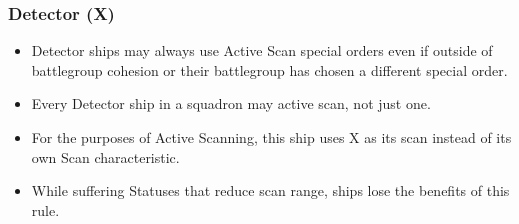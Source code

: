 \subsubsection{Detector (X)}
\begin{itemize}
    \item Detector ships may always use Active Scan special orders even if outside of battlegroup cohesion or their battlegroup has chosen a different special order.
    \item Every Detector ship in a squadron may active scan, not just one.
    \item For the purposes of Active Scanning, this ship uses X as its scan instead of its own Scan characteristic.
    \item While suffering Statuses that reduce scan range, ships lose the benefits of this rule.
\end{itemize}

